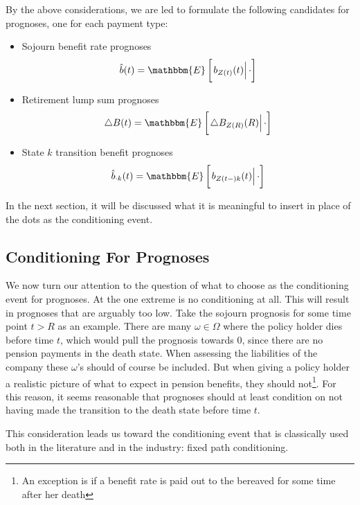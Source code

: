 \documentclass{article}
\newcommand{\1}[1]{\mathbbm{1}_{\left\lbrace #1 \right\rbrace}}
\newcommand{\econd}[2][def]{\mathbbm{E} \left[ \left. #1 \right| #2 \right]}
\theoremstyle{break}
\theoremstyle{remark}
\numberwithin{equation}{section}
\begin{document}
By the above considerations, we are led to formulate the following candidates for prognoses, one for each payment type:

\begin{itemize}
    \item Sojourn benefit rate prognoses
    \begin{align*}
        \hat{b}(t) = \econd[b_{Z(t)}(t)]{\cdot}
    \end{align*}
    \item Retirement lump sum prognoses
    \begin{align*}
        \triangle B(t) = \econd[\triangle B_{Z(R)}(R)]{\cdot}
    \end{align*}
    \item State $k$ transition benefit prognoses
    \begin{align*}
        \hat{b}_{\cdot k}(t) = \econd[b_{Z(t-)k}(t)]{\cdot}
    \end{align*}
\end{itemize}

In the next section, it will be discussed what it is meaningful to insert in place of the dots as the conditioning event.

\subsection{Conditioning For Prognoses} \label{CondForProg}

We now turn our attention to the question of what to choose as the conditioning event for prognoses. At the one extreme is no conditioning at all. This will result in prognoses that are arguably too low. Take the sojourn prognosis for some time point $t>R$ as an example. There are many $\omega \in \Omega$ where the policy holder dies before time $t$, which would pull the prognosis towards 0, since there are no pension payments in the death state. When assessing the liabilities of the company these $\omega$'s should of course be included. But when giving a policy holder a realistic picture of what to expect in pension benefits, they should not\footnote{An exception is if a benefit rate is paid out to the bereaved for some time after her death}. For this reason, it seems reasonable that prognoses should at least condition on not having made the transition to the death state before time $t$.

This consideration leads us toward the conditioning event that is classically used both in the literature and in the industry: fixed path conditioning.
\end{document}

